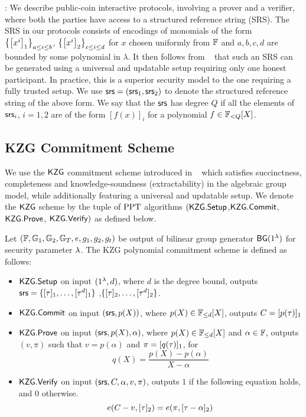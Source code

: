 : We describe public-coin interactive protocols, involving a prover and a verifier,
where both the parties have access to a structured reference string (SRS). The SRS in our protocols consists of
encodings of monomials of the form $\left\{\left[{x^i}\right]_1\right\}_{a\leq i\leq b}$, $\left\{\left[{x^i}\right]_2\right\}_{c\leq i\leq d}$
for $x$ chosen uniformly from $\mathbb{F}$ and $a,b,c,d$ are bounded by some polynomial in $\lambda$. It then follows
from ~\cite{EPRINT:BowGabMie17} that such an SRS can be generated using a universal and updatable setup requiring
only one honest participant. In practice, this is a superior security model to the one requiring a fully
trusted setup. We use $\mathsf{srs} = (\mathsf{srs}_1,\mathsf{srs}_2)$ to denote the structured reference string of the above form. We say
that the $\mathsf{srs}$ has degree $Q$ if all the elements of $\mathsf{srs}_i$, $i=1,2$ are of the form $[f(x)]_i$ for a
polynomial $f\in \mathbb{F}_{<Q}[X]$.

\subsection{KZG Commitment Scheme}
\label{sec:KZG}
We use the $\mathsf{KZG}$ commitment scheme introduced in ~\cite{AC:KatZavGol10} which satisfies succinctness, completeness and knowledge-soundness (extractability)
in the algebraic group model, while additionally featuring a universal and updatable setup. We denote the $\mathsf{KZG}$ scheme by the tuple
of $\mathrm{PPT}$ algorithms $(\mathsf{KZG.Setup}$,$\mathsf{KZG.Commit}$, $\mathsf{KZG.Prove}$, $\mathsf{KZG.Verify})$ as defined below.
\begin{definition}
	Let $(\mathbb{F},\mathbb{G}_1,\mathbb{G}_2,\mathbb{G}_T, e, g_1, g_2, g_t)$ be output of bilinear group generator $\mathsf{BG}(1^{\lambda})$ for security parameter $\lambda$.
	The KZG polynomial commitment scheme is defined as follows:
	\begin{itemize}[leftmargin=1em]
		\item $\mathsf{KZG.Setup}$ on input $(1^{\lambda},d)$, where $d$ is the degree bound, outputs
		$\mathsf{srs} = \{[\tau]_1,\ldots,[\tau^d]_1\}$ ,$\{[\tau]_2,\ldots,[\tau^d]_2\}$.
		\item $\mathsf{KZG.Commit}$ on input $(\mathsf{srs},p(X))$, where $p(X) \in \mathbb{F}_{\leq d}[X]$, outputs $C=[p(\tau)]_1$
		\item $\mathsf{KZG.Prove}$ on input $(\mathsf{srs},p(X),\alpha)$, where $p(X) \in \mathbb{F}_{\leq d}[X]$ and $\alpha\in \mathbb{F}$, outputs $(v, \pi)$ such that $v=p(\alpha)$ and $\pi=[q(\tau)]_1$, for
		\[ q(X)=\frac{p(X)-p(\alpha)}{X-\alpha} \]
		\item $\mathsf{KZG.Verify}$ on input $(\mathsf{srs},C,\alpha,v,\pi)$, outputs $1$ if the following equation holds, and $0$ otherwise.
		\[ e(C-v, [\tau]_2) = e(\pi, [\tau-\alpha]_2) \]
	\end{itemize}
\end{definition}

